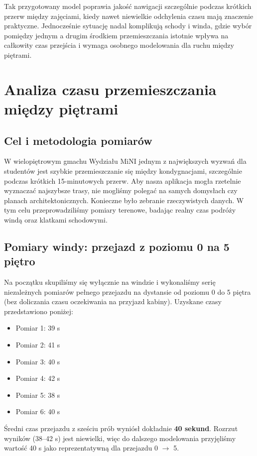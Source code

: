 \documentclass[14pt,a4paper]{extarticle}
\begin{document}
Tak przygotowany model poprawia jakość nawigacji szczególnie podczas krótkich przerw między zajęciami, kiedy nawet niewielkie odchylenia czasu mają znaczenie praktyczne. Jednocześnie sytuację nadal komplikują schody i winda, gdzie wybór pomiędzy jednym a drugim środkiem przemieszczania istotnie wpływa na całkowity czas przejścia i wymaga osobnego modelowania dla ruchu między piętrami.

\section{Analiza czasu przemieszczania między piętrami}

\subsection{Cel i metodologia pomiarów}
W wielopiętrowym gmachu Wydziału MiNI jednym z największych wyzwań dla studentów jest szybkie przemieszczanie się między kondygnacjami, szczególnie podczas krótkich 15-minutowych przerw. Aby nasza aplikacja mogła rzetelnie wyznaczać najszybsze trasy, nie mogliśmy polegać na samych domysłach czy planach architektonicznych. Konieczne było zebranie rzeczywistych danych. W tym celu przeprowadziliśmy pomiary terenowe, badając realny czas podróży windą oraz klatkami schodowymi.

\subsection{Pomiary windy: przejazd z poziomu 0 na 5 piętro}
Na początku skupiliśmy się wyłącznie na windzie i wykonaliśmy serię niezależnych pomiarów pełnego przejazdu na dystansie od poziomu 0 do 5 piętra (bez doliczania czasu oczekiwania na przyjazd kabiny). Uzyskane czasy przedstawiono poniżej:
\begin{itemize}
    \item Pomiar 1: 39 s
    \item Pomiar 2: 41 s
    \item Pomiar 3: 40 s
    \item Pomiar 4: 42 s
    \item Pomiar 5: 38 s
    \item Pomiar 6: 40 s
\end{itemize}

Średni czas przejazdu z sześciu prób wyniósł dokładnie \textbf{40 sekund}. Rozrzut wyników (38--42 s) jest niewielki, więc do dalszego modelowania przyjęliśmy wartość 40 s jako reprezentatywną dla przejazdu 0 $\rightarrow$ 5.
\end{document}
